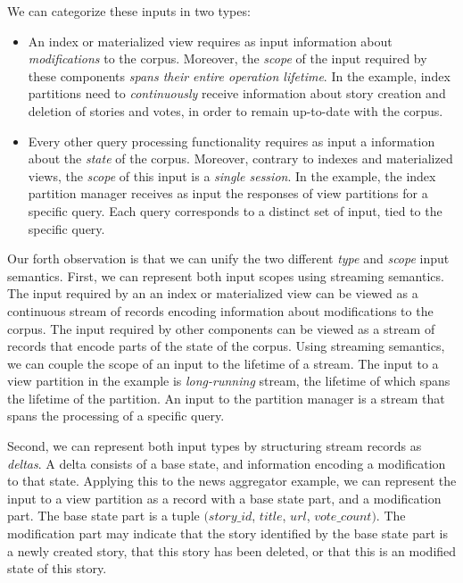 We can categorize these inputs in two types:
\begin{itemize}
  \item An index or materialized view requires as input information about \textit{modifications} to the corpus.
  Moreover, the \textit{scope} of the input required by these components \textit{spans their entire operation lifetime}.
  In the example, index partitions need to \textit{continuously} receive information about story creation and deletion of
  stories and votes, in order to remain up-to-date with the corpus.

  \item Every other query processing functionality requires as input a information about the \textit{state} of the corpus.
  Moreover, contrary to indexes and materialized views, the \textit{scope} of this input is a \textit{single session}.
  In the example, the index partition manager receives as input the responses of view partitions for a specific query.
  Each query corresponds to a distinct set of input, tied to the specific query.
\end{itemize}

Our forth observation is that we can unify the two different \textit{type} and \textit{scope} input semantics.
First, we can represent both input scopes using streaming semantics.
The input required by an an index or materialized view can be viewed as a continuous stream of records encoding information about modifications to the corpus.
The input required by other components can be viewed as a stream of records that encode parts of the state of the corpus.
Using streaming semantics, we can couple the scope of an input to the lifetime of a stream.
The input to a view partition in the example is \textit{long-running} stream, the lifetime of which spans the lifetime of the partition.
An input to the partition manager is a stream that spans the processing of a specific query.

Second, we can represent both input types by structuring stream records as \textit{deltas}.
A delta consists of a base state, and information encoding a modification to that state.
Applying this to the news aggregator example,
we can represent the input to a view partition as a record with a base state part, and a modification part.
The base state part is a tuple $(story\_id$, $title$, $url$, $vote\_count)$.
The modification part may indicate that the story identified by the base state part is a newly created story,
that this story has been deleted,
or that this is an modified state of this story.

